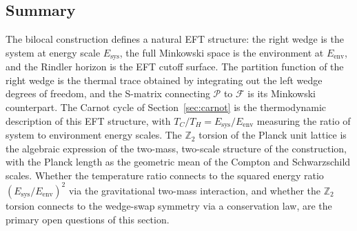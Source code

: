 \documentclass[12pt,a4paper]{article}
\begin{document}


\subsection{Summary}

The bilocal construction defines a natural EFT 
structure: the right wedge is the system at energy 
scale $E_{\text{sys}}$, the full Minkowski space is 
the environment at $E_{\text{env}}$, and the Rindler 
horizon is the EFT cutoff surface. The partition 
function of the right wedge is the thermal trace 
obtained by integrating out the left wedge degrees 
of freedom, and the S-matrix connecting $\mathcal{P}$ 
to $\mathcal{F}$ is its Minkowski counterpart. The 
Carnot cycle of Section~\ref{sec:carnot} is the 
thermodynamic description of this EFT structure, 
with $T_C/T_H = E_{\text{sys}}/E_{\text{env}}$ 
measuring the ratio of system to environment energy 
scales. The $\mathbb{Z}_2$ torsion of the Planck 
unit lattice is the algebraic expression of the 
two-mass, two-scale structure of the construction, 
with the Planck length as the geometric mean of 
the Compton and Schwarzschild scales. Whether the 
temperature ratio connects to the squared energy 
ratio $(E_{\text{sys}}/E_{\text{env}})^2$ via the 
gravitational two-mass interaction, and whether 
the $\mathbb{Z}_2$ torsion connects to the wedge-swap 
symmetry via a conservation law, are the primary 
open questions of this section.
\end{document}

